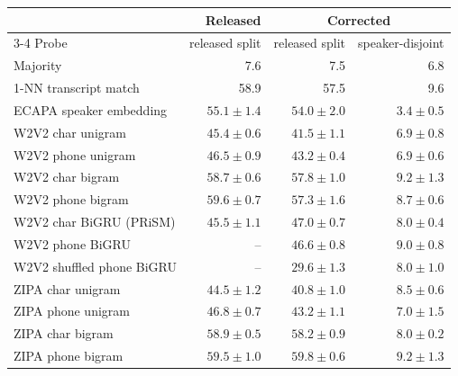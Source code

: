 \begin{tabular}{lrrr}
\toprule
 & Released & \multicolumn{2}{c}{Corrected} \\
\cmidrule(lr){3-4}
Probe & released split & released split & speaker-disjoint \\
\midrule
Majority & 7.6 & 7.5 & 6.8 \\
1-NN transcript match & 58.9 & 57.5 & 9.6 \\
ECAPA speaker embedding & $55.1 \pm 1.4$ & $54.0 \pm 2.0$ & $3.4 \pm 0.5$ \\
W2V2 char unigram & $45.4 \pm 0.6$ & $41.5 \pm 1.1$ & $6.9 \pm 0.8$ \\
W2V2 phone unigram & $46.5 \pm 0.9$ & $43.2 \pm 0.4$ & $6.9 \pm 0.6$ \\
W2V2 char bigram & $58.7 \pm 0.6$ & $57.8 \pm 1.0$ & $9.2 \pm 1.3$ \\
W2V2 phone bigram & $59.6 \pm 0.7$ & $57.3 \pm 1.6$ & $8.7 \pm 0.6$ \\
W2V2 char BiGRU (PRiSM) & $45.5 \pm 1.1$ & $47.0 \pm 0.7$ & $8.0 \pm 0.4$ \\
W2V2 phone BiGRU & -- & $46.6 \pm 0.8$ & $9.0 \pm 0.8$ \\
W2V2 shuffled phone BiGRU & -- & $29.6 \pm 1.3$ & $8.0 \pm 1.0$ \\
ZIPA char unigram & $44.5 \pm 1.2$ & $40.8 \pm 1.0$ & $8.5 \pm 0.6$ \\
ZIPA phone unigram & $46.8 \pm 0.7$ & $43.2 \pm 1.1$ & $7.0 \pm 1.5$ \\
ZIPA char bigram & $58.9 \pm 0.5$ & $58.2 \pm 0.9$ & $8.0 \pm 0.2$ \\
ZIPA phone bigram & $59.5 \pm 1.0$ & $59.8 \pm 0.6$ & $9.2 \pm 1.3$ \\
\bottomrule
\end{tabular}
